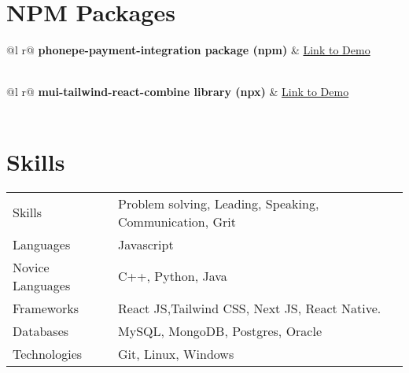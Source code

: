 \documentclass[a4paper,12pt]{article}
\begin{document}
\section{NPM Packages}
\begin{refsection}
\begin{tabularx}{\linewidth}{ @{}l r@{} }
\textbf{phonepe-payment-integration package (npm) } & \hfill \href{https://www.npmjs.com/package/phonepe-payment-integration}{Link to Demo} \\[3.75pt]
  \\
\end{tabularx}

\begin{tabularx}{\linewidth}{ @{}l r@{} }
\textbf{mui-tailwind-react-combine library (npx)} & \hfill \href{https://www.npmjs.com/package/react-mui-tailwind_css_frontend}{Link to Demo} \\[3.75pt]
  \\
\end{tabularx}
\end{refsection}

\section{Skills}
\begin{tabularx}{\linewidth}{@{}l X@{}}
Skills &  \normalsize{Problem solving, Leading, Speaking, Communication, Grit}\\
Languages  &  \normalsize{Javascript}\\  
Novice Languages   &  \normalsize{C++, Python, Java}\\  

Frameworks  &  \normalsize{React JS,Tailwind CSS, Next JS, React Native.}\\  
Databases  &  \normalsize{MySQL, MongoDB, Postgres, Oracle}\\  
Technologies  &  \normalsize{Git, Linux, Windows}\\  

\end{tabularx}
\end{document}
